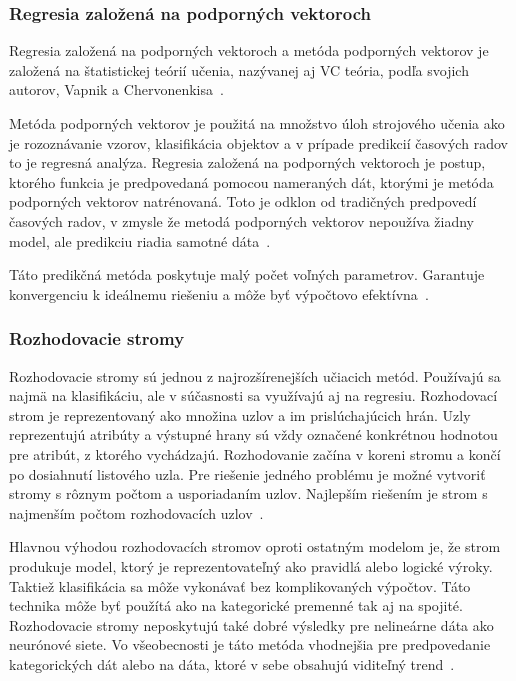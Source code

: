 \documentclass[a4paper,slovak,12pt,appendix]{article}
\begin{document}

\subsubsection{Regresia založená na podporných vektoroch}
Regresia založená na podporných vektoroch a metóda podporných vektorov je
založená na štatistickej teórií učenia, nazývanej aj VC teória, podľa svojich
autorov, Vapnik a Chervonenkisa~\cite{Sapankevych2009}.

Metóda podporných vektorov je použitá na množstvo úloh strojového učenia ako je
rozoznávanie vzorov, klasifikácia objektov a v prípade predikcií časových
radov to je regresná analýza. Regresia založená na podporných vektoroch je
postup, ktorého funkcia je predpovedaná pomocou nameraných dát, ktorými je
metóda podporných vektorov natrénovaná. Toto je odklon od tradičných predpovedí
časových radov, v zmysle že metodá podporných vektorov nepoužíva žiadny model,
ale predikciu riadia samotné dáta~\cite{Sapankevych2009}.

Táto predikčná metóda poskytuje malý počet voľných parametrov. Garantuje
konvergenciu k ideálnemu riešeniu a môže byť výpočtovo
efektívna~\cite{Sapankevych2009}.


\subsubsection{Rozhodovacie stromy}
Rozhodovacie stromy sú jednou z najrozšírenejších učiacich metód. Používajú sa
najmä na klasifikáciu, ale v súčasnosti sa využívajú aj na regresiu.
Rozhodovací strom je reprezentovaný ako množina uzlov a im prislúchajúcich
hrán. Uzly reprezentujú atribúty a výstupné hrany sú vždy označené konkrétnou
hodnotou pre atribút, z ktorého vychádzajú. Rozhodovanie začína v koreni stromu
a končí po dosiahnutí listového uzla. Pre riešenie jedného problému je možné
vytvoriť stromy s rôznym počtom a usporiadaním uzlov. Najlepším riešením je
strom s najmenším počtom rozhodovacích uzlov~\cite{Merz1998}.

Hlavnou výhodou rozhodovacích stromov oproti ostatným modelom je, že strom
produkuje model, ktorý je reprezentovateľný ako pravidlá alebo logické výroky.
Taktiež klasifikácia sa môže vykonávať bez komplikovaných výpočtov. Táto
technika môže byť použítá ako na kategorické premenné tak aj na spojité.
Rozhodovacie stromy neposkytujú také dobré výsledky pre nelineárne dáta ako
neurónové siete. Vo všeobecnosti je táto metóda vhodnejšia pre predpovedanie
kategorických dát alebo na dáta, ktoré v sebe obsahujú viditeľný
trend~\cite{Tso2007}.
\end{document}
